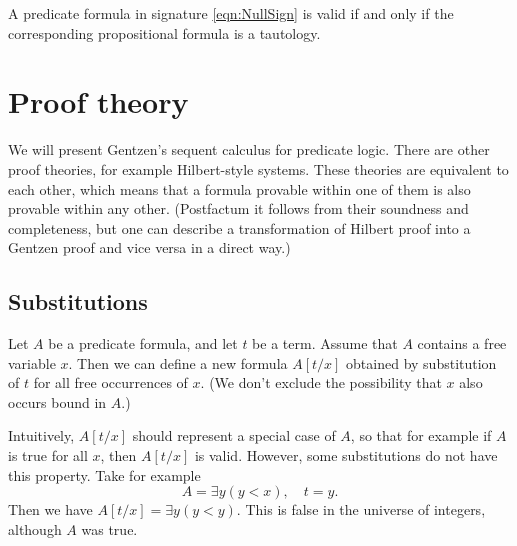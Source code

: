 \begin{page}
\setcounter{section}{1}
\setcounter{subsection}{5}
\setcounter{dfn}{15}
\label{portion:608}

\begin{thm}
A predicate formula in signature \eqref{eqn:NullSign} is valid if and only if the corresponding propositional formula is a tautology.
\end{thm}

\end{page}

\begin{page}
\setcounter{section}{2}
\setcounter{subsection}{1}
\setcounter{dfn}{0}
\label{portion:611}

\section{Proof theory}
We will present Gentzen's sequent calculus for predicate logic.
There are other proof theories, for example Hilbert-style systems.
These theories are equivalent to each other, which means that a formula provable within one of them is also provable within any other.
(Postfactum it follows from their soundness and completeness,
but one can describe a transformation of Hilbert proof into a Gentzen proof and vice versa in a direct way.)



\end{page}

\begin{page}
\setcounter{section}{2}
\setcounter{subsection}{1}
\setcounter{dfn}{0}
\label{portion:613}

\subsection{Substitutions}
Let $A$ be a predicate formula, and let $t$ be a term.
Assume that $A$ contains a free variable $x$.
Then we can define a new formula $A[t/x]$ obtained by substitution of $t$ for all free occurrences of $x$.
(We don't exclude the possibility that $x$ also occurs bound in $A$.)

Intuitively, $A[t/x]$ should represent a special case of $A$, so that for example if $A$ is true for all $x$, then $A[t/x]$ is valid.
However, some substitutions do not have this property.
Take for example
\[
A = \exists y (y < x), \quad t = y.
\]
Then we have $A[t/x] = \exists y (y < y)$.
This is false in the universe of integers, although $A$ was true.


\end{page}

